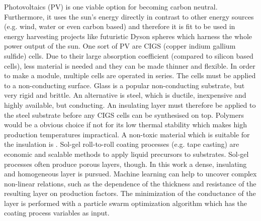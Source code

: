 Photovoltaics (PV) is one viable option for becoming carbon neutral. 
Furthermore, 
it uses the sun's energy directly in contrast to other energy sources (e.g. wind, water or even carbon based) and therefore 
it is fit to be used in energy harvesting projects like futuristic Dyson spheres\cite{dyson1960search} which harness the whole power output of the sun.
%
One sort of PV are CIGS (copper indium gallium sulfide) cells\cite{Vasekar2010}. 
Due to their large absorption coefficient (compared to silicon based cells), less material is needed and they can be made thinner and flexible. 
In order to make a module, multiple cells are operated in series. 
The cells must be applied to a non-conducting surface.
Glass is a popular non-conducting substrate, but very rigid and brittle. 
An alternative is steel, which is ductile, inexpensive and highly available, but conducting. 
An insulating layer must therefore be applied to the steel substrate before any CIGS cells can be synthesised on top.
Polymers would be a obvious choice if not for its low thermal stability which makes high production temperatures impractical.
A non-toxic material which is suitable for the insulation is . 
Sol-gel roll-to-roll coating processes (e.g. tape casting) are economic and scalable methods to apply liquid precursors to substrates.
Sol-gel processes often produce porous layers, though. 
In this work a dense, insulating and homogeneous layer is pursued. 
Machine learning can help to uncover complex non-linear relations, such as the 
dependence of the thickness and resistance of the resulting layer on production factors.
The minimization of the conductance of the layer is performed with a particle swarm optimization 
algorithm which has the coating process variables as input. 


